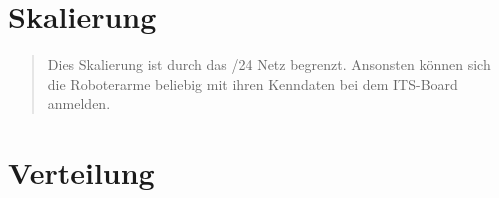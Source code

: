 

\section{Skalierung}

\begin{quote}
Dies Skalierung ist durch das /24 Netz begrenzt. Ansonsten können sich die Roboterarme beliebig mit ihren Kenndaten bei dem ITS-Board anmelden.
\end{quote}



\section{Verteilung}


